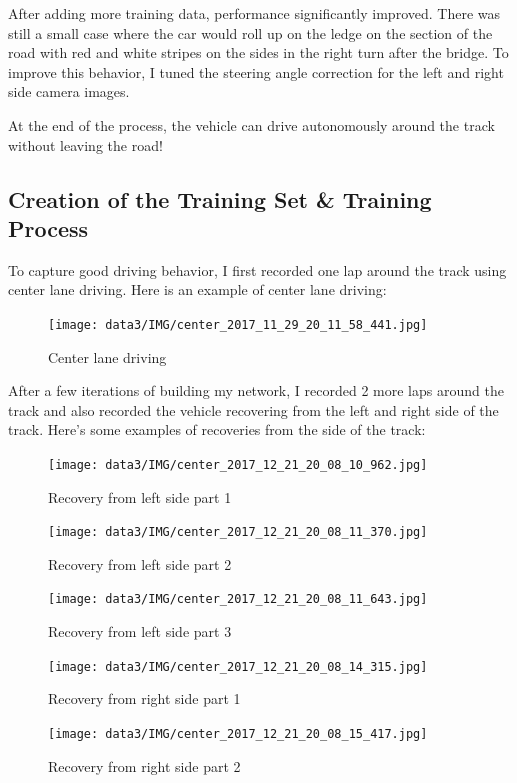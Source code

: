 \documentclass[12pt]{article}
\begin{document}
After adding more training data, performance significantly improved. There was still a small case where the car would roll up on the ledge on the section of the road with red and white stripes on the sides in the right turn after the bridge. To improve this behavior, I tuned the steering angle correction for the left and right side camera images. 

At the end of the process, the vehicle can drive autonomously around the track without leaving the road!

\subsection{Creation of the Training Set \& Training Process}
To capture good driving behavior, I first recorded one lap around the track using center lane driving. Here is an example of center lane driving:
\begin{figure}[h]
\centering
\texttt{[image: data3/IMG/center\_2017\_11\_29\_20\_11\_58\_441.jpg]}
\caption{Center lane driving}
\end{figure}

After a few iterations of building my network, I recorded 2 more laps around the track and also recorded the vehicle recovering from the left and right side of the track. Here's some examples of recoveries from the side of the track:
\begin{figure}[h]
\centering
\texttt{[image: data3/IMG/center\_2017\_12\_21\_20\_08\_10\_962.jpg]}
\caption{Recovery from left side part 1}
\end{figure}

\begin{figure}[h]
\centering
\texttt{[image: data3/IMG/center\_2017\_12\_21\_20\_08\_11\_370.jpg]}
\caption{Recovery from left side part 2}
\end{figure}

\begin{figure}[h]
\centering
\texttt{[image: data3/IMG/center\_2017\_12\_21\_20\_08\_11\_643.jpg]}
\caption{Recovery from left side part 3}
\end{figure}

\begin{figure}[h]
\centering
\texttt{[image: data3/IMG/center\_2017\_12\_21\_20\_08\_14\_315.jpg]}
\caption{Recovery from right side part 1}
\end{figure}

\begin{figure}[h]
\centering
\texttt{[image: data3/IMG/center\_2017\_12\_21\_20\_08\_15\_417.jpg]}
\caption{Recovery from right side part 2}
\end{figure}
\end{document}
